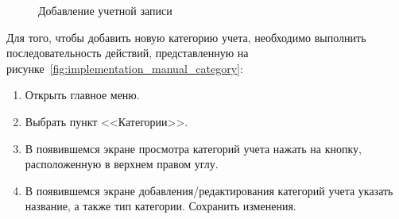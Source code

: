 \begin{figure}[h!]
  \centering
  \caption{Добавление учетной записи}
  \label{fig:implementation_manual_account}
\end{figure}

Для того, чтобы добавить новую категорию учета, необходимо выполнить
последовательность действий, представленную на
рисунке~\ref{fig:implementation_manual_category}:
\begin{enumerate}
  \item Открыть главное меню.
  \item Выбрать пункт <<Категории>>.
  \item В появившемся экране просмотра категорий учета
    нажать на кнопку, расположенную в верхнем правом углу.
  \item В появившемся экране добавления/редактирования
    категорий учета указать название, а также тип категории.
    Сохранить изменения.
\end{enumerate}

